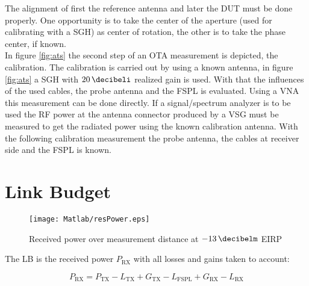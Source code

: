 The alignment of first the reference antenna and later the \ac{DUT} must be done properly. One opportunity is to take the center of the aperture (used for calibrating with a \ac{SGH}) as center of rotation, the other is to take the phase center, if known.\\
In figure \ref{fig:ats} the second step of an \ac{OTA} measurement is depicted, the calibration. The calibration is carried out by using a known antenna, in figure \ref{fig:ats} a \ac{SGH} with $\SI{20}{\decibeli}$ realized gain is used. With that the influences of the used cables, the probe antenna and the \ac{FSPL} is evaluated. Using a \ac{VNA} this measurement can be done directly. If a signal/spectrum analyzer is to be used the \ac{RF} power at the antenna connector produced by a \ac{VSG} must be measured to get the radiated power using the known calibration antenna. With the following calibration measurement the probe antenna, the cables at receiver side and the \ac{FSPL} is known. \cite{ctiaat}

\section{Link Budget}

\begin{figure}[H]
\centering
\texttt{[image: Matlab/resPower.eps]}
\caption{Received power over measurement distance at $\SI{-13}{\decibelm}$ EIRP}
\label{fig:resP}
\end{figure}

The \ac{LB} is the received power $P_{\text{RX}}$ with all losses and gains taken to account:

\begin{equation}
P_{\text{RX}} = P_{\text{TX}}-L_{\text{TX}}+G_{\text{TX}}-L_{\text{FSPL}} + G_{\text{RX}}-L_{\text{RX}}
\end{equation}

